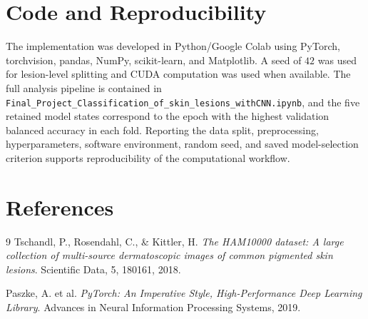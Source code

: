 \documentclass[11pt,a4paper]{article}
\begin{document}
\section{Code and Reproducibility}
The implementation was developed in Python/Google Colab using PyTorch, torchvision, pandas, NumPy, scikit-learn, and Matplotlib. A seed of $42$ was used for lesion-level splitting and CUDA computation was used when available. The full analysis pipeline is contained in \texttt{Final\_Project\_Classification\_of\_skin\_lesions\_withCNN.ipynb}, and the five retained model states correspond to the epoch with the highest validation balanced accuracy in each fold. Reporting the data split, preprocessing, hyperparameters, software environment, random seed, and saved model-selection criterion supports reproducibility of the computational workflow.

\section{References}
\begin{thebibliography}{9}
Tschandl, P., Rosendahl, C., \& Kittler, H. \textit{The HAM10000 dataset: A large collection of multi-source dermatoscopic images of common pigmented skin lesions}. Scientific Data, 5, 180161, 2018.

Paszke, A. et al. \textit{PyTorch: An Imperative Style, High-Performance Deep Learning Library}. Advances in Neural Information Processing Systems, 2019.
\end{thebibliography}
\end{document}

